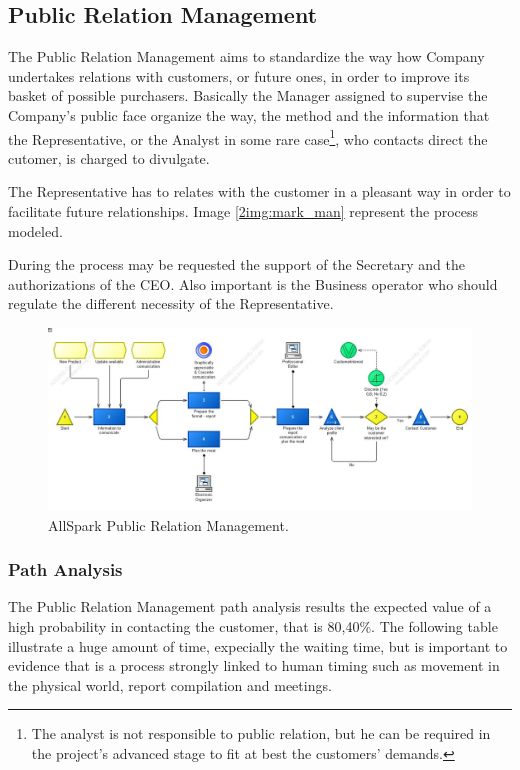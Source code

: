 %

\subsection{Public Relation Management}
The Public Relation Management aims to standardize the way how Company undertakes relations with customers, or future ones, in order to improve its  basket of possible purchasers. Basically the Manager assigned to supervise the Company's public face organize the way, the method and the information that the Representative, or the Analyst in some rare case\footnote{The analyst is not responsible to public relation, but he can be required in the project's advanced stage to fit at best the customers' demands.}, who contacts direct the cutomer, is charged to divulgate. 

The Representative has to relates with the customer in a pleasant way in order to facilitate future relationships. Image \ref{2img:mark_man} represent the process modeled.

During the process may be requested the support of the Secretary and the authorizations of the CEO. Also important is the Business operator who should regulate the different necessity of the Representative.

\begin{figure}[ht!]
\begin{centering}
\includegraphics[scale=0.40, angle=90]{assign2/adonis/imgs/pr_man.jpg}
\caption{AllSpark Public Relation Management.}
\label{2img:pr_man}
\end{centering}
\end{figure}


\subsubsection{Path Analysis}
The Public Relation Management path analysis results the expected value of a high probability in contacting the customer, that is 80,40\%. The following table illustrate a huge amount of time, expecially the waiting time, but is important to evidence that is a process strongly linked to human timing such as movement in the physical world, report compilation and meetings.

